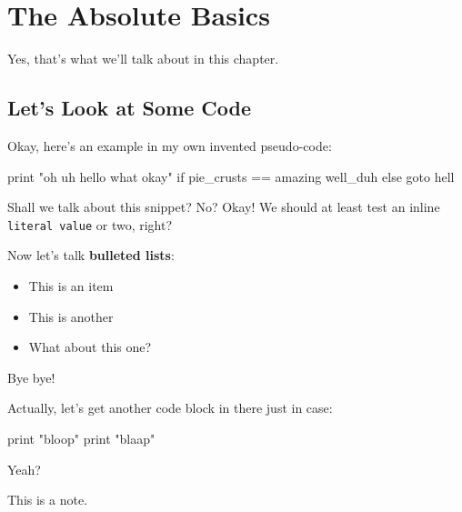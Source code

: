 \chapter{The Absolute Basics}

Yes, that's what we'll talk about in this chapter.

\section{Let's Look at Some Code}

Okay, here's an example in my own invented pseudo-code:

\begin{Code}
print "oh uh hello what okay"
if pie_crusts == amazing
    well_duh
else
    goto hell
\end{Code}

Shall we talk about this snippet? No? Okay! We should at least test an
inline \verb!literal value! or two, right?

Now let's talk \textbf{bulleted lists}:

\begin{itemize}
\item
  This is an item
\item
  This is another
\item
  What about this one?
\end{itemize}
Bye bye!

Actually, let's get another code block in there just in case:

\begin{Code}
print "bloop"
print "blaap"
\end{Code}

Yeah?

\begin{note}
This is a note.
\end{note}
